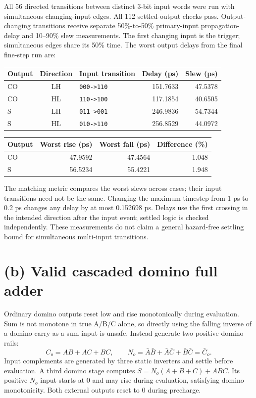 \documentclass[11pt]{article}
\begin{document}
All 56 directed transitions between distinct 3-bit input words were run with simultaneous changing-input edges. All 112 settled-output checks pass. Output-changing transitions receive separate 50\%-to-50\% primary-input propagation-delay and 10--90\% slew measurements. The first changing input is the trigger; simultaneous edges share its 50\% time. The worst output delays from the final fine-step run are:
\begin{center}\begin{tabular}{lclrr}\toprule Output&Direction&Input transition&Delay (ps)&Slew (ps)\\\midrule
CO&LH&\texttt{000->110}&151.7633&47.5378\\
CO&HL&\texttt{110->100}&117.1854&40.6505\\
S&LH&\texttt{011->001}&246.9836&54.7344\\
S&HL&\texttt{010->110}&256.8529&44.0972\\
\bottomrule\end{tabular}\end{center}
\begin{center}\begin{tabular}{lrrr}\toprule Output&Worst rise (ps)&Worst fall (ps)&Difference (\%)\\\midrule
CO&47.9592&47.4564&1.048\\
S&56.5234&55.4221&1.948\\
\bottomrule\end{tabular}\end{center}
The matching metric compares the worst slews across cases; their input transitions need not be the same. Changing the maximum timestep from 1 ps to 0.2 ps changes any delay by at most 0.152698 ps. Delays use the first crossing in the intended direction after the input event; settled logic is checked independently. These measurements do not claim a general hazard-free settling bound for simultaneous multi-input transitions.

\newpage\section*{(b) Valid cascaded domino full adder}
Ordinary domino outputs reset low and rise monotonically during evaluation. Sum is not monotone in true A/B/C alone, so directly using the falling inverse of a domino carry as a sum input is unsafe. Instead generate two positive domino rails:
\[
C_o=AB+AC+BC,\qquad N_o=\bar A\bar B+\bar A\bar C+\bar B\bar C=\bar C_o.
\]
Input complements are generated by three static inverters and settle before evaluation. A third domino stage computes $S=N_o(A+B+C)+ABC$. Its positive $N_o$ input starts at 0 and may rise during evaluation, satisfying domino monotonicity. Both external outputs reset to 0 during precharge.
\end{document}
